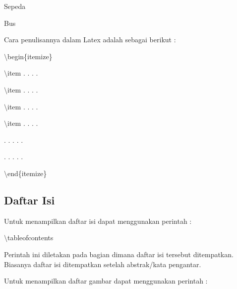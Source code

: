 Sepeda\par \vspace{12pt}

Bus\par \vspace{12pt}

Cara penulisannya dalam Latex adalah sebagai berikut :\par \vspace{12pt}

$\setminus$begin\{itemize\}\par \vspace{12pt}

$\setminus$item . . . .\par \vspace{12pt}

$\setminus$item . . . .\par \vspace{12pt}

$\setminus$item . . . .\par \vspace{12pt}

$\setminus$item . . . .\par \vspace{12pt}

. . . . .

. . . . .\par \vspace{12pt}

$\setminus$end\{itemize\}\par \vspace{12pt}



\subsection {Daftar Isi}\par \vspace{12pt}

Untuk menampilkan daftar isi dapat menggunakan perintah :\par \vspace{12pt}

$\setminus$tableofcontents\par \vspace{12pt}

Perintah ini diletakan pada bagian dimana daftar isi tersebut 
ditempatkan. Biasanya daftar isi ditempatkan setelah abstrak/kata pengantar.

Untuk menampilkan daftar gambar dapat menggunakan perintah :\par \vspace{12pt}

